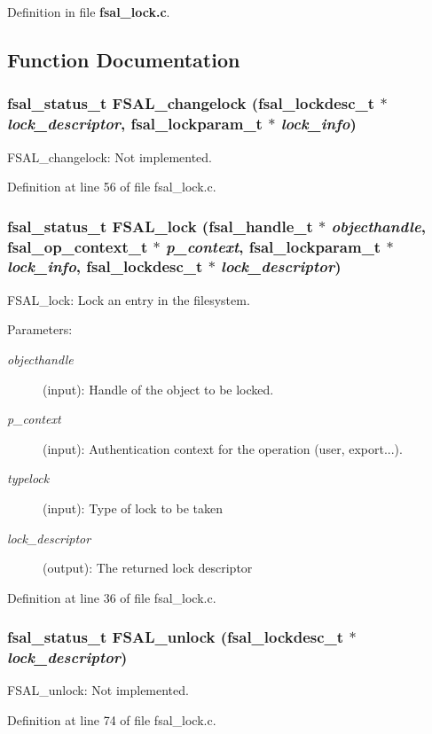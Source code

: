 Definition in file {\bf fsal\_\-lock.c}.

\subsection{Function Documentation}
\subsubsection[{FSAL\_\-changelock}]{\setlength{\rightskip}{0pt plus 5cm}fsal\_\-status\_\-t FSAL\_\-changelock (fsal\_\-lockdesc\_\-t $\ast$ {\em lock\_\-descriptor}, \/  fsal\_\-lockparam\_\-t $\ast$ {\em lock\_\-info})}\label{fsal__lock_8c_d7440144c01257bb00d1a357760739ec}


FSAL\_\-changelock: Not implemented. 

Definition at line 56 of file fsal\_\-lock.c.
\subsubsection[{FSAL\_\-lock}]{\setlength{\rightskip}{0pt plus 5cm}fsal\_\-status\_\-t FSAL\_\-lock (fsal\_\-handle\_\-t $\ast$ {\em objecthandle}, \/  fsal\_\-op\_\-context\_\-t $\ast$ {\em p\_\-context}, \/  fsal\_\-lockparam\_\-t $\ast$ {\em lock\_\-info}, \/  fsal\_\-lockdesc\_\-t $\ast$ {\em lock\_\-descriptor})}\label{fsal__lock_8c_c3ed7385fa0551a1f1e6e82cae20f971}


FSAL\_\-lock: Lock an entry in the filesystem.

\begin{Desc}
\item[Parameters:]
\begin{description}
\item[{\em objecthandle}](input): Handle of the object to be locked. \item[{\em p\_\-context}](input): Authentication context for the operation (user, export...). \item[{\em typelock}](input): Type of lock to be taken \item[{\em lock\_\-descriptor}](output): The returned lock descriptor \end{description}
\end{Desc}


Definition at line 36 of file fsal\_\-lock.c.
\subsubsection[{FSAL\_\-unlock}]{\setlength{\rightskip}{0pt plus 5cm}fsal\_\-status\_\-t FSAL\_\-unlock (fsal\_\-lockdesc\_\-t $\ast$ {\em lock\_\-descriptor})}\label{fsal__lock_8c_842a0ed5dbbda6ba1febd76ed2c32b6d}


FSAL\_\-unlock: Not implemented. 

Definition at line 74 of file fsal\_\-lock.c.